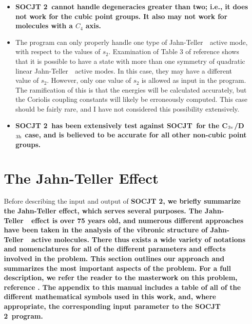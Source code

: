 \documentclass{article}
\newcommand{\JT}{Jahn-Teller\ }
\newcommand{\socjttwo}{\bf{SOCJT 2}}
\newcommand{\socjt}{{\bf SOCJT}}
\newenvironment{bulletlist}{%
  \renewcommand{\labelitemi}{$\bullet $}%
     \begin{itemize}}{\end{itemize}}
\begin{document}
\begin{bulletlist}
\item \socjttwo\ cannot handle degeneracies greater than two; i.e., it
  does not work for the cubic point groups. It also may not
  work for molecules with a $C_4$ axis. %
\item The program can only properly handle one type of \JT\ active
  mode, with respect to the values of $s_2$. Examination of
  Table 3 of reference  shows that it is possible to have
  a state with more than one symmetry of quadratic linear \JT\ active
  modes. In this case, they may have a different value of
  $s_2$. However, only one value of $s_2$ is allowed as input in the
  program. The ramification of this is that the energies will be
  calculated accurately, but the Coriolis coupling constants will
  likely be erroneously computed. This case should be fairly rare, and
  I have not considered this possibility extensively.
\item \socjttwo\ has been extensively test against \socjt\ for the C$_{3\textnormal{v}}$/D$_{3\textnormal{h}}$ case, and
  is believed to be accurate for all other non-cubic point groups.
\end{bulletlist}

\section{The Jahn-Teller Effect} \label{section:jt}

Before describing the input and output of \socjttwo, we briefly summarize
the Jahn-Teller effect, which serves several purposes. The \JT\ effect
is over 75 years old, and numerous different approaches have been
taken in the analysis of the vibronic structure of \JT\ active
molecules. There thus exists a wide variety of notations and
nomenclatures for all of the different parameters and effects involved
in the problem. This section outlines our approach and summarizes the
most important aspects of the problem. For a full description, we
refer the reader to the masterwork on this problem, reference
. The appendix to this manual includes a table of all of
the different mathematical symbols used in this work, and, where 
appropriate, the corresponding input parameter to the \socjttwo\ program.
\end{document}
